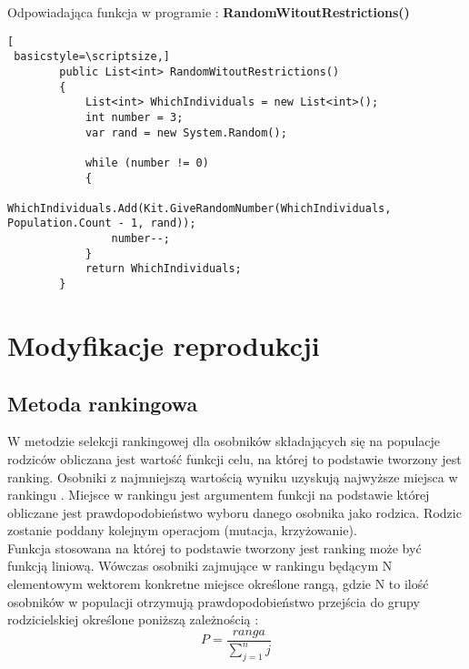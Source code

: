 \par
Odpowiadająca funkcja w programie :\textbf{ RandomWitoutRestrictions()}

\begin{program}
\begin{lstlisting}[
 basicstyle=\scriptsize,]
        public List<int> RandomWitoutRestrictions()
        {
            List<int> WhichIndividuals = new List<int>();
            int number = 3;
            var rand = new System.Random();

            while (number != 0)
            {
                WhichIndividuals.Add(Kit.GiveRandomNumber(WhichIndividuals, Population.Count - 1, rand));
                number--;
            }
            return WhichIndividuals;
        }
\end{lstlisting}
\end{program}


\section{Modyfikacje reprodukcji}\label{sec:kompilacja}
\subsection{Metoda rankingowa}\label{sec:kompilacja}


W metodzie selekcji rankingowej dla osobników składających się na populacje rodziców obliczana jest wartość funkcji celu, na której to podstawie tworzony jest ranking. Osobniki z najmniejszą wartością wyniku uzyskują najwyższe miejsca w rankingu \cite{selekcje}. Miejsce w rankingu jest argumentem funkcji na podstawie której obliczane jest prawdopodobieństwo wyboru danego osobnika jako rodzica. Rodzic zostanie poddany kolejnym operacjom (mutacja, krzyżowanie).\\
 Funkcja stosowana na której to podstawie tworzony jest ranking może być funkcją liniową. Wówczas osobniki zajmujące w rankingu będącym N elementowym wektorem konkretne miejsce określone rangą, gdzie N to ilość osobników w populacji otrzymują prawdopodobieństwo przejścia do grupy rodzicielskiej określone poniższą zależnością \cite{Lam92}:
$$
P = \frac{ranga}{\sum_{j=1}^{n}j}
$$

